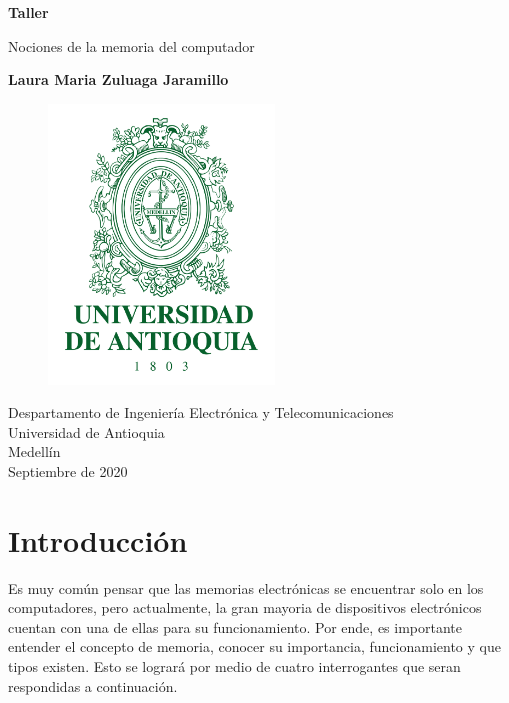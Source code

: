 \documentclass{article}
\begin{document}
\begin{titlepage}
    \begin{center}
        \vspace*{1cm}
            
        \Huge
        \textbf{Taller}
            
        \vspace{0.5cm}
        \LARGE
        Nociones de la memoria del computador
            
        \vspace{1.5cm}
            
        \textbf{Laura Maria Zuluaga Jaramillo}
        
        \vspace{0.8cm}
        
        \begin{figure}[h]
        \includegraphics[width=6cm]{udea.png}
        \centering
        \label{fig:udea}
        \end{figure}
            
        \vfill
            
        \vspace{0.8cm}
         
        \Large
        Despartamento de Ingeniería Electrónica y Telecomunicaciones\\
        Universidad de Antioquia\\
        Medellín\\
        Septiembre de 2020
            
    \end{center}
\end{titlepage}

\tableofcontents

\section{Introducción}
Es muy común pensar que las memorias electrónicas se encuentrar solo en los computadores, pero actualmente, la gran mayoria de dispositivos electrónicos cuentan con una de ellas para su funcionamiento. Por ende, es importante entender el concepto de memoria, conocer su importancia, funcionamiento y que tipos existen. Esto se logrará por medio de cuatro interrogantes que seran respondidas a continuación.
\end{document}
